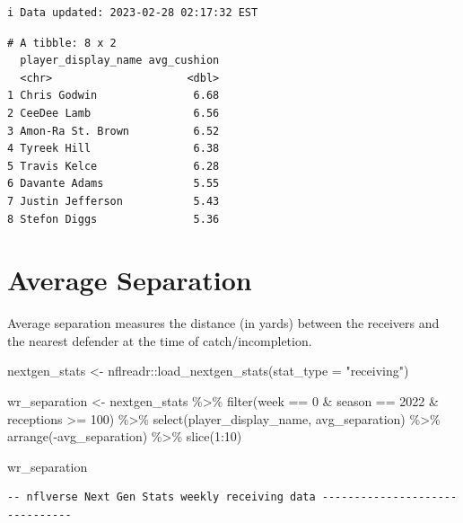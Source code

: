\documentclass[
  letterpaper,
]{krantz}
\newenvironment{Shaded}{\begin{snugshade}}{\end{snugshade}}
\newcommand{\AttributeTok}[1]{\textcolor[rgb]{0.40,0.45,0.13}{#1}}
\newcommand{\DecValTok}[1]{\textcolor[rgb]{0.68,0.00,0.00}{#1}}
\newcommand{\FunctionTok}[1]{\textcolor[rgb]{0.28,0.35,0.67}{#1}}
\newcommand{\NormalTok}[1]{\textcolor[rgb]{0.00,0.23,0.31}{#1}}
\newcommand{\OtherTok}[1]{\textcolor[rgb]{0.00,0.23,0.31}{#1}}
\newcommand{\SpecialCharTok}[1]{\textcolor[rgb]{0.37,0.37,0.37}{#1}}
\newcommand{\StringTok}[1]{\textcolor[rgb]{0.13,0.47,0.30}{#1}}
\begin{document}
\begin{verbatim}
i Data updated: 2023-02-28 02:17:32 EST
\end{verbatim}

\begin{verbatim}
# A tibble: 8 x 2
  player_display_name avg_cushion
  <chr>                     <dbl>
1 Chris Godwin               6.68
2 CeeDee Lamb                6.56
3 Amon-Ra St. Brown          6.52
4 Tyreek Hill                6.38
5 Travis Kelce               6.28
6 Davante Adams              5.55
7 Justin Jefferson           5.43
8 Stefon Diggs               5.36
\end{verbatim}

\hypertarget{average-separation}{%
\section{Average Separation}\label{average-separation}}

Average separation measures the distance (in yards) between the
receivers and the nearest defender at the time of catch/incompletion.

\begin{Shaded}
\begin{Highlighting}[]
\NormalTok{nextgen\_stats }\OtherTok{\textless{}{-}}\NormalTok{ nflreadr}\SpecialCharTok{::}\FunctionTok{load\_nextgen\_stats}\NormalTok{(}\AttributeTok{stat\_type =} \StringTok{"receiving"}\NormalTok{)}

\NormalTok{wr\_separation }\OtherTok{\textless{}{-}}\NormalTok{ nextgen\_stats }\SpecialCharTok{\%\textgreater{}\%}
  \FunctionTok{filter}\NormalTok{(week }\SpecialCharTok{==} \DecValTok{0} \SpecialCharTok{\&}\NormalTok{ season }\SpecialCharTok{==} \DecValTok{2022} \SpecialCharTok{\&}\NormalTok{ receptions }\SpecialCharTok{\textgreater{}=} \DecValTok{100}\NormalTok{) }\SpecialCharTok{\%\textgreater{}\%}
  \FunctionTok{select}\NormalTok{(player\_display\_name, avg\_separation) }\SpecialCharTok{\%\textgreater{}\%}
  \FunctionTok{arrange}\NormalTok{(}\SpecialCharTok{{-}}\NormalTok{avg\_separation) }\SpecialCharTok{\%\textgreater{}\%}
  \FunctionTok{slice}\NormalTok{(}\DecValTok{1}\SpecialCharTok{:}\DecValTok{10}\NormalTok{)}

\NormalTok{wr\_separation}
\end{Highlighting}
\end{Shaded}

\begin{verbatim}
-- nflverse Next Gen Stats weekly receiving data -------------------------------
\end{verbatim}
\end{document}
